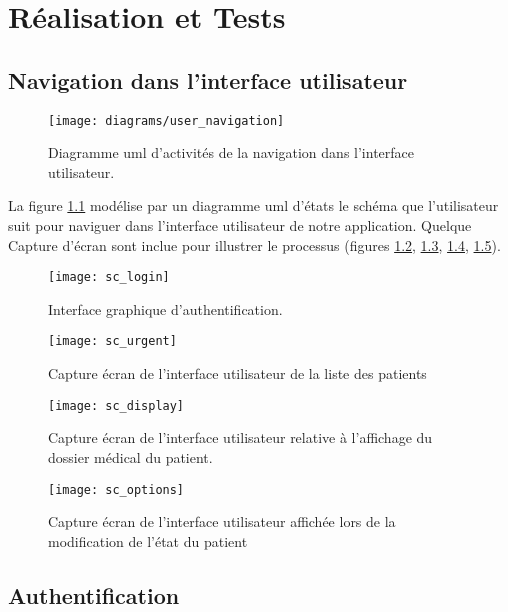 \chapter{Réalisation et Tests}


\section{Navigation dans l'interface utilisateur}

\begin{figure}
\center
\texttt{[image: diagrams/user\_navigation]}
\caption{Diagramme \gls{uml} d'activités de la navigation dans l'interface utilisateur.}
\label{fig:uml_act_ui}
\end{figure}

La figure \ref{fig:uml_act_ui} modélise par un diagramme \gls{uml} d'états le schéma que l'utilisateur suit pour naviguer dans l'interface utilisateur de notre application. Quelque Capture d'écran sont inclue pour illustrer le processus (figures \ref{fig:sc_login}, \ref{fig:sc_urgent}, \ref{fig:sc_display}, \ref{fig:sc_options}).

\begin{figure}
\center
\texttt{[image: sc\_login]}
\caption{Interface graphique d'authentification.}
\label{fig:sc_login}
\end{figure}

\begin{figure}
\center
\texttt{[image: sc\_urgent]}
\caption{Capture écran de l'interface utilisateur de la liste des patients}
\label{fig:sc_urgent}
\end{figure}

\begin{figure}
\center
\texttt{[image: sc\_display]}
\caption{Capture écran de l'interface utilisateur relative à l'affichage du dossier médical du patient.}
\label{fig:sc_display}
\end{figure}

\begin{figure}
\center
\texttt{[image: sc\_options]}
\caption{Capture écran de l'interface utilisateur affichée lors de la modification de l’état du patient}
\label{fig:sc_options}
\end{figure}

\section{Authentification}

